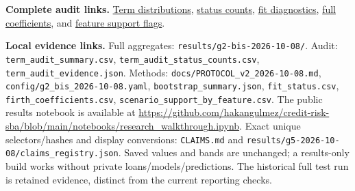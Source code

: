 \textbf{Complete audit links.} \href{https://github.com/hakangulmez/credit-risk-sba/blob/main/results/g2-bis-2026-10-08/term_audit_summary.csv}{Term distributions}, \href{https://github.com/hakangulmez/credit-risk-sba/blob/main/results/g2-bis-2026-10-08/term_audit_status_counts.csv}{status counts}, \href{https://github.com/hakangulmez/credit-risk-sba/blob/main/results/g2-bis-2026-10-08/fit_status.csv}{fit diagnostics}, \href{https://github.com/hakangulmez/credit-risk-sba/blob/main/results/g2-bis-2026-10-08/firth_coefficients.csv}{full coefficients}, and \href{https://github.com/hakangulmez/credit-risk-sba/blob/main/results/g2-bis-2026-10-08/scenario_support_by_feature.csv}{feature support flags}.\par\textbf{Local evidence links.} Full aggregates: \nolinkurl{results/g2-bis-2026-10-08/}. Audit: \nolinkurl{term_audit_summary.csv}, \nolinkurl{term_audit_status_counts.csv}, \nolinkurl{term_audit_evidence.json}. Methods: \nolinkurl{docs/PROTOCOL_v2_2026-10-08.md}, \nolinkurl{config/g2_bis_2026-10-08.yaml}, \nolinkurl{bootstrap_summary.json}, \nolinkurl{fit_status.csv}, \nolinkurl{firth_coefficients.csv}, \nolinkurl{scenario_support_by_feature.csv}. The public results notebook is available at \url{https://github.com/hakangulmez/credit-risk-sba/blob/main/notebooks/research_walkthrough.ipynb}. Exact unique selectors/hashes and display conversions: \nolinkurl{CLAIMS.md} and \nolinkurl{results/g5-2026-10-08/claims_registry.json}. Saved values and bands are unchanged; a results-only build works without private loans/models/predictions. The historical full test run is retained evidence, distinct from the current reporting checks.

